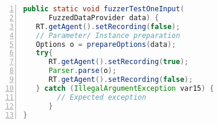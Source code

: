 \begin{lstlisting}[float=tbh,language=Java,caption={Harness showing selective coverage instrumentation through runtime control of JaCoCo's recording state. The coverage handling calls are added using offline instrumentation after compilation.},label={lst:coverage-tracking},float=htbp,basicstyle=\small\ttfamily,numbers=left,numberstyle=\tiny\color{gray},frame=single]
public static void fuzzerTestOneInput(
      FuzzedDataProvider data) {
   RT.getAgent().setRecording(false); 
   // Parameter/ Instance preparation
   Options o = prepareOptions(data);
   try{
      RT.getAgent().setRecording(true);
      Parser.parse(o);
      RT.getAgent().setRecording(false);
   } catch (IllegalArgumentException var15) {
        // Expected exception 
      }
}
\end{lstlisting}